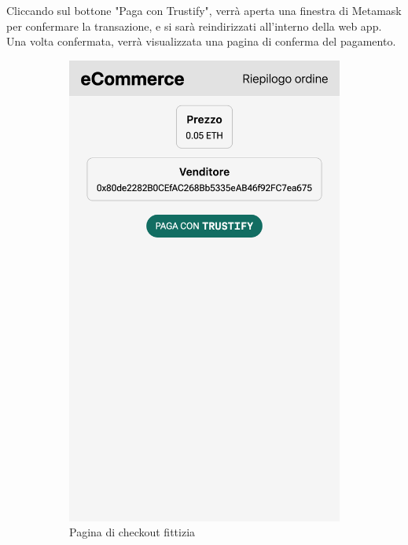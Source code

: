 Cliccando sul bottone "Paga con Trustify", verrà aperta una finestra di Metamask per confermare la transazione, e si sarà reindirizzati all'interno della web app. Una volta confermata, verrà visualizzata una pagina di conferma del pagamento.

\begin{figure}[t]
    \begin{subfigure}{0.33\textwidth}
    \centering
    \includegraphics[width=0.9\linewidth]{src/img/checkout.png}
    \caption{Pagina di checkout fittizia}\label{fig:checkout_page}
    \end{subfigure}
    \begin{subfigure}{0.33\textwidth}
    \centering

\end{subfigure}
\end{figure}
